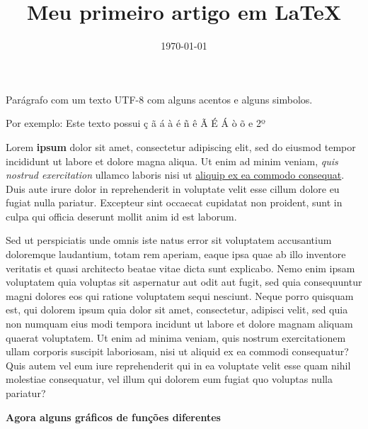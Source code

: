 \documentclass{article}
\title{Meu primeiro artigo em \LaTeX}
\date{\today}
\begin{document}
\maketitle

Parágrafo com um texto UTF-8 com alguns acentos e alguns simbolos.  

Por exemplo: Este texto possui ç ã á à é ñ ê Ã É Á ò õ e 2º

\begin{flushright}
	Lorem \textbf{ipsum} dolor sit amet, consectetur adipiscing elit, sed do eiusmod tempor incididunt ut labore et dolore magna aliqua. Ut enim ad minim veniam, \textit{quis nostrud exercitation }ullamco laboris nisi ut \underline{aliquip ex ea commodo consequat}. Duis aute irure dolor in reprehenderit in voluptate velit esse cillum dolore eu fugiat nulla pariatur. Excepteur sint occaecat cupidatat non proident, sunt in culpa qui officia deserunt mollit anim id est laborum. %
\end{flushright}

Sed ut perspiciatis unde omnis iste natus error sit voluptatem accusantium doloremque laudantium, totam rem aperiam, eaque ipsa quae ab illo inventore veritatis et quasi architecto beatae vitae dicta sunt explicabo. Nemo enim ipsam voluptatem quia voluptas sit aspernatur aut odit aut fugit, sed quia consequuntur magni dolores eos qui ratione voluptatem sequi nesciunt. Neque porro quisquam est, qui dolorem ipsum quia dolor sit amet, consectetur, adipisci velit, sed quia non numquam eius modi tempora incidunt ut labore et dolore magnam aliquam quaerat voluptatem. Ut enim ad minima veniam, quis nostrum exercitationem ullam corporis suscipit laboriosam, nisi ut aliquid ex ea commodi consequatur? Quis autem vel eum iure reprehenderit qui in ea voluptate velit esse quam nihil molestiae consequatur, vel illum qui dolorem eum fugiat quo voluptas nulla pariatur?

\textbf{Agora alguns gráficos de funções diferentes}


\end{document}
